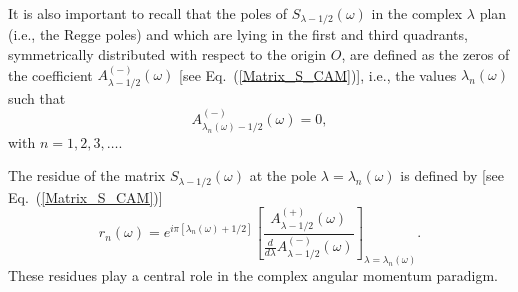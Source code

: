 \documentclass[aps,prd,longbibliography,reprint,twocolumn,amsmath,amssymb,amsfonts,showpacs,footnote,superscriptaddress]{revtex4-1}%
\begin{document}

%

It is also important to recall that the poles of  $S_{\lambda-1/2}(\omega)$ in the complex $\lambda$ plan (i.e., the Regge poles) and which are lying in the first and third quadrants, symmetrically distributed with respect to the origin $O$, are defined  as  the zeros of the coefficient  $A^{(-)}_{\lambda-1/2} (\omega)$ [see Eq.~(\ref{Matrix_S_CAM})], i.e., the values $\lambda_n(\omega)$ such that
\begin{equation}\label{PR_def_Am}
A^{(-)}_{\lambda_n(\omega)-1/2} (\omega)=0,
\end{equation}
with $n=1,2,3,\ldots$.

The residue of the matrix $S_{\lambda-1/2}(\omega)$ at the pole $\lambda=\lambda_n(\omega)$ is defined by [see Eq.~(\ref{Matrix_S_CAM})]
\begin{equation}\label{residues_RP}
r_n(\omega)=e^{i\pi [\lambda_n(\omega)+1/2]} \left[ \frac{A_{\lambda -1/2}^{(+)}(\omega)}{\frac{d}{d \lambda}A_{\lambda -1/2}^{(-)}(\omega)}\right]_{\lambda=\lambda_n(\omega)}.
\end{equation}
These residues play a central role in the complex angular momentum paradigm.
\end{document}
